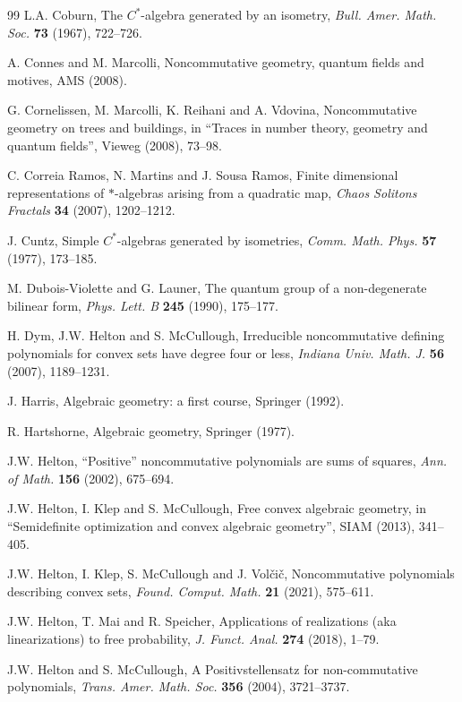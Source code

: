 \documentclass[11pt]{amsart}
\theoremstyle{definition}
\begin{document}
\begin{thebibliography}{99}
 L.A. Coburn, The $C^*$-algebra generated by an isometry, {\em Bull. Amer. Math. Soc.} {\bf 73} (1967), 722--726.

 A. Connes and M. Marcolli, Noncommutative geometry, quantum fields and motives, AMS (2008).

 G. Cornelissen, M. Marcolli, K. Reihani and A. Vdovina, Noncommutative geometry on trees and buildings, in ``Traces in number theory, geometry and quantum fields'', Vieweg (2008), 73--98.

 C. Correia Ramos, N. Martins and J. Sousa Ramos, Finite dimensional representations of $*$-algebras arising from a quadratic map, {\em Chaos Solitons Fractals} {\bf 34} (2007), 1202--1212.

 J. Cuntz, Simple $C^*$-algebras generated by isometries, {\em Comm. Math. Phys.} {\bf 57} (1977), 173--185.

 M. Dubois-Violette and G. Launer, The quantum group of a non-degenerate bilinear form, {\em Phys. Lett. B} {\bf 245} (1990), 175--177.

 H. Dym, J.W. Helton and S. McCullough, Irreducible noncommutative defining polynomials for convex sets have degree four or less, {\em Indiana Univ. Math. J.} {\bf 56} (2007), 1189--1231.

 J. Harris, Algebraic geometry: a first course, Springer (1992).

 R. Hartshorne, Algebraic geometry, Springer (1977).

 J.W. Helton, ``Positive'' noncommutative polynomials are sums of squares, {\em Ann. of Math.} {\bf 156} (2002), 675--694.

 J.W. Helton, I. Klep and S. McCullough, Free convex algebraic geometry, in ``Semidefinite optimization and convex algebraic geometry'', SIAM (2013), 341--405.

 J.W. Helton, I. Klep, S. McCullough and J. Vol\v ci\v c, Noncommutative polynomials describing convex sets, {\em Found. Comput. Math.} {\bf 21} (2021), 575--611.

 J.W. Helton, T. Mai and R. Speicher, Applications of realizations (aka linearizations) to free probability, {\em J. Funct. Anal.} {\bf 274} (2018), 1--79.

 J.W. Helton and S. McCullough, A Positivstellensatz for non-commutative polynomials, {\em Trans. Amer. Math. Soc.} {\bf 356} (2004), 3721--3737.


\end{thebibliography}
\end{document}
